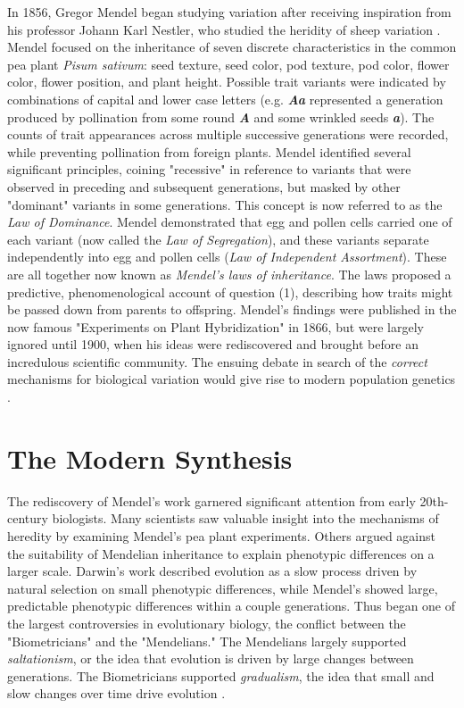 In 1856, Gregor Mendel began studying variation after receiving inspiration from his professor Johann Karl Nestler, who studied the heridity of sheep variation \cite{henig_monk_2000}. Mendel focused on the inheritance of seven discrete characteristics in the common pea plant \textit{Pisum sativum}: seed texture, seed color, pod texture, pod color, flower color, flower position, and plant height. Possible trait variants were indicated by combinations of capital and lower case letters (e.g. \textbf{\textit{Aa}} represented a generation produced by pollination from some round \textbf{\textit{A}} and some wrinkled seeds \textbf{\textit{a}}). The counts of trait appearances across multiple successive generations were recorded, while preventing pollination from foreign plants. Mendel identified several significant principles, coining "recessive" in reference to variants that were observed in preceding and subsequent generations, but masked by other "dominant" variants in some generations. This concept is now referred to as the \textit{Law of Dominance}. Mendel demonstrated that egg and pollen cells carried one of each variant (now called the \textit{Law of Segregation}), and these variants separate independently into egg and pollen cells (\textit{Law of Independent Assortment}). These are all together now known as \textit{Mendel's laws of inheritance}. The laws proposed a predictive, phenomenological account of question (1), describing how traits might be passed down from parents to offspring. Mendel's findings were published in the now famous "Experiments on Plant Hybridization" \cite{mendel_1865} in 1866, but were largely ignored until 1900, when his ideas were rediscovered and brought before an incredulous scientific community. The ensuing debate in search of the \textit{correct} mechanisms for biological variation would give rise to modern population genetics \cite{bowler_evolution_2003}.


\section{The Modern Synthesis}
The rediscovery of Mendel's work garnered significant attention from early 20th-century biologists. Many scientists saw valuable insight into the mechanisms of heredity by examining Mendel's pea plant experiments. Others argued against the suitability of Mendelian inheritance to explain phenotypic differences on a larger scale. Darwin's work described evolution as a slow process driven by natural selection on small phenotypic differences, while Mendel's showed large, predictable phenotypic differences within a couple generations. Thus began one of the largest controversies in evolutionary biology, the conflict between the "Biometricians" and the "Mendelians." The Mendelians largely supported \textit{saltationism}, or the idea that evolution is driven by large changes between generations. The Biometricians supported \textit{gradualism}, the idea that small and slow changes over time drive evolution \cite{gilham_2015}. 


